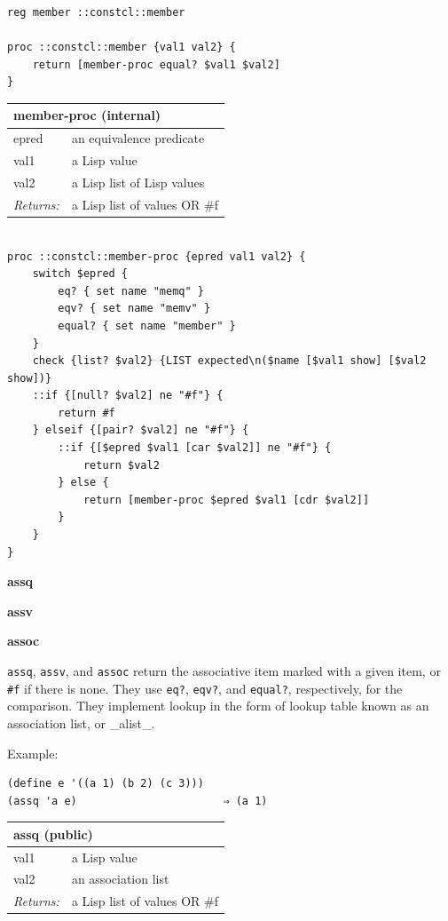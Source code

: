 \documentclass[twoside,9pt]{report}
\begin{document}
\noindent\makebox[\linewidth]{\rule{\linewidth}{0.4pt}}
\begin{lstlisting}
reg member ::constcl::member
 
proc ::constcl::member {val1 val2} {
    return [member-proc equal? $val1 $val2]
}
\end{lstlisting}
\noindent\makebox[\linewidth]{\rule{\linewidth}{0.4pt}}
\begin{tabular}{ |l l| }
\hline
\multicolumn{2}{|l|}{member-proc (internal)} \\
\hline
epred & an equivalence predicate \\
val1 & a Lisp value \\
val2 & a Lisp list of Lisp values \\
\textit{Returns:} & a Lisp list of values OR \#f \\
\hline
\end{tabular}

\noindent\makebox[\linewidth]{\rule{\linewidth}{0.4pt}}
\begin{lstlisting}
 
proc ::constcl::member-proc {epred val1 val2} {
    switch $epred {
        eq? { set name "memq" }
        eqv? { set name "memv" }
        equal? { set name "member" }
    }
    check {list? $val2} {LIST expected\n($name [$val1 show] [$val2 show])}
    ::if {[null? $val2] ne "#f"} {
        return #f
    } elseif {[pair? $val2] ne "#f"} {
        ::if {[$epred $val1 [car $val2]] ne "#f"} {
            return $val2
        } else {
            return [member-proc $epred $val1 [cdr $val2]]
        }
    }
}
\end{lstlisting}
\noindent\makebox[\linewidth]{\rule{\linewidth}{0.4pt}}

\textbf{assq}


\textbf{assv}


\textbf{assoc}


\texttt{assq}, \texttt{assv}, and \texttt{assoc} return the associative item marked with a given item, or \texttt{\#f} if there is none. They use \texttt{eq?}, \texttt{eqv?}, and \texttt{equal?}, respectively, for the comparison. They implement lookup in the form of lookup table known as an association list, or \_alist\_.


Example:

\noindent\makebox[\linewidth]{\rule{\linewidth}{0.4pt}}
\begin{lstlisting}
(define e '((a 1) (b 2) (c 3)))
(assq 'a e)                       ⇒ (a 1)
\end{lstlisting}
\noindent\makebox[\linewidth]{\rule{\linewidth}{0.4pt}}
\begin{tabular}{ |l l| }
\hline
\multicolumn{2}{|l|}{assq (public)} \\
\hline
val1 & a Lisp value \\
val2 & an association list \\
\textit{Returns:} & a Lisp list of values OR \#f \\
\hline
\end{tabular}
\end{document}
